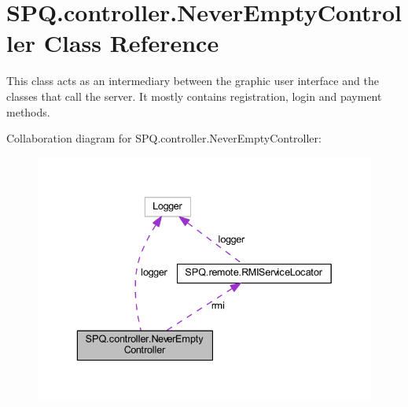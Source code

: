 \hypertarget{class_s_p_q_1_1controller_1_1_never_empty_controller}{}\section{S\+P\+Q.\+controller.\+Never\+Empty\+Controller Class Reference}
\label{class_s_p_q_1_1controller_1_1_never_empty_controller}


This class acts as an intermediary between the graphic user interface and the classes that call the server. It mostly contains registration, login and payment methods.  




Collaboration diagram for S\+P\+Q.\+controller.\+Never\+Empty\+Controller\+:\nopagebreak
\begin{figure}[H]
\begin{center}
\leavevmode
\includegraphics[width=336pt]{class_s_p_q_1_1controller_1_1_never_empty_controller__coll__graph}
\end{center}
\end{figure}
